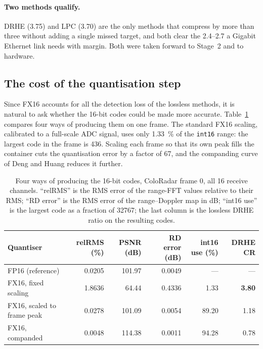 \paragraph{Two methods qualify.}
DRHE (\num{3.75}) and LPC (\num{3.70}) are the only methods that compress by
more than three without adding a single missed target, and both clear the
\num{2.4}--\num{2.7} a Gigabit Ethernet link needs with margin. Both were taken
forward to Stage~2 and to hardware.

\subsection{The cost of the quantisation step}
\label{sec:quant}

Since FX16 accounts for all the detection loss of the lossless methods, it is
natural to ask whether the 16-bit codes could be made more accurate.
Table~\ref{tab:quant} compares four ways of producing them on one frame. The
standard FX16 scaling, calibrated to a full-scale ADC signal, uses only
\SI{1.33}{\percent} of the \texttt{int16} range: the largest code in the frame
is 436. Scaling each frame so that its own peak fills the container cuts the
quantisation error by a factor of 67, and the companding curve of Deng and
Huang \cite{deng2024} reduces it further.

\begin{table}[htbp]
\centering
\caption[Quantisation study]{Four ways of producing the 16-bit codes, ColoRadar
frame 0, all 16 receive channels. ``relRMS'' is the RMS error of the range-FFT
values relative to their RMS; ``RD error'' is the RMS error of the
range--Doppler map in dB; ``int16 use'' is the largest code as a fraction of
\num{32767}; the last column is the lossless DRHE ratio on the resulting codes.}
\label{tab:quant}
\small
\setlength{\tabcolsep}{4pt}
\begin{tabular}{@{}lrrrrr@{}}
\toprule
Quantiser & relRMS (\%) & PSNR (dB) & RD error (dB) & int16 use (\%) & DRHE CR\\
\midrule
FP16 (reference)            & 0.0205 & 101.97 & 0.0049 & ---   & ---\\
FX16, fixed scaling         & 1.8636 & 64.44  & 0.4336 & 1.33  & \textbf{3.80}\\
FX16, scaled to frame peak  & 0.0278 & 101.09 & 0.0054 & 89.20 & 1.18\\
FX16, companded \cite{deng2024} & 0.0048 & 114.38 & 0.0011 & 94.28 & 0.78\\
\bottomrule
\end{tabular}
\end{table}

